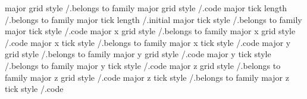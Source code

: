 major grid style         /.belongs to family
major grid style         /.code
major tick length        /.belongs to family
major tick length        /.initial
major tick style         /.belongs to family
major tick style         /.code
major x grid style       /.belongs to family
major x grid style       /.code
major x tick style       /.belongs to family
major x tick style       /.code
major y grid style       /.belongs to family
major y grid style       /.code
major y tick style       /.belongs to family
major y tick style       /.code
major z grid style       /.belongs to family
major z grid style       /.code
major z tick style       /.belongs to family
major z tick style       /.code

